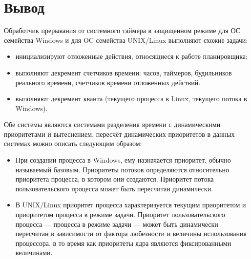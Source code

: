 \chapter*{Вывод}

Обработчик прерывания от системного таймера в защищенном режиме для ОС
семейства Windows и для OC семейства UNIX/Linux выполняют схожие задачи:
\begin{itemize}
    \item инициализируют отложенные действия, относящиеся к
          работе планировщика;
    \item выполняют декремент счетчиков времени: часов, таймеров, будильников
          реального времени, счетчиков времени отложенных действий.
    \item выполняют декремент кванта (текущего процесса в Linux,
          текущего потока в Windows).
\end{itemize}

Обе системы являются системами разделения времени с динамическими приоритетами
и вытеснением, пересчёт динамических приоритетов в данных системах можно
описать следующим образом:
\begin{itemize}
    \item При создании процесса в Windows, ему назначается приоритет,
          обычно называемый базовым. Приоритеты потоков определяются
          относительно приоритета процесса, в котором они создаются. Приоритет
          потока пользовательского процесса может быть пересчитан динамически.
    \item В UNIX/Linux приоритет процесса характеризуется текущим
          приоритетом и приоритетом процесса в режиме задачи. Приоритет
          пользовательского процесса --- процесса в режиме задачи --- может
          быть динамически пересчитан в зависимости от фактора любезности и
          величины использования процессора, в то время как приоритеты ядра
          являются фиксированными величинами.
\end{itemize}
